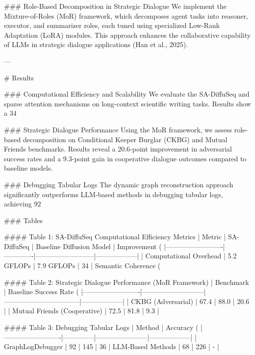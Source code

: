 ### Role-Based Decomposition in Strategic Dialogue  
We implement the Mixture-of-Roles (MoR) framework, which decomposes agent tasks into reasoner, executor, and summarizer roles, each tuned using specialized Low-Rank Adaptation (LoRA) modules. This approach enhances the collaborative capability of LLMs in strategic dialogue applications (Han et al., 2025).  

---

# Results  

### Computational Efficiency and Scalability  
We evaluate the SA-DiffuSeq and sparse attention mechanisms on long-context scientific writing tasks. Results show a 34%

### Strategic Dialogue Performance  
Using the MoR framework, we assess role-based decomposition on Conditional Keeper Burglar (CKBG) and Mutual Friends benchmarks. Results reveal a 20.6-point improvement in adversarial success rates and a 9.3-point gain in cooperative dialogue outcomes compared to baseline models.  

### Debugging Tabular Logs  
The dynamic graph reconstruction approach significantly outperforms LLM-based methods in debugging tabular logs, achieving 92%

### Tables  

#### Table 1: SA-DiffuSeq Computational Efficiency Metrics  
| Metric                  | SA-DiffuSeq | Baseline Diffusion Model | Improvement (%
|-------------------------|-------------|--------------------------|------------------|  
| Computational Overhead  | 5.2 GFLOPs  | 7.9 GFLOPs               | 34%
| Semantic Coherence (%

#### Table 2: Strategic Dialogue Performance (MoR Framework)  
| Benchmark               | Baseline Success Rate (%
|-------------------------|---------------------------|---------------------------------|------------------|  
| CKBG (Adversarial)      | 67.4                     | 88.0                           | 20.6            |  
| Mutual Friends (Cooperative) | 72.5               | 81.8                           | 9.3             |  

#### Table 3: Debugging Tabular Logs  
| Method                  | Accuracy (%
|-------------------------|--------------|-----------------------|------------------|  
| GraphLogDebugger        | 92           | 145                   | 36%
| LLM-Based Methods       | 68           | 226                   | -               |  

